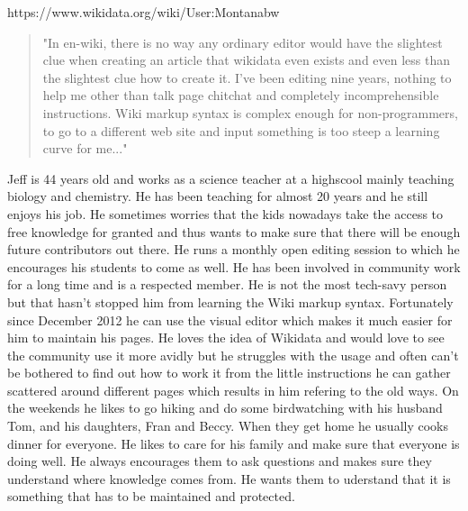 \documentclass{article}
\begin{document}
\pagebreak

https://www.wikidata.org/wiki/User:Montanabw
\begin{quote}
"In en-wiki, there is no way any ordinary editor would have the slightest clue when creating an article that wikidata even exists and even less than the slightest clue how to create it. I've been editing nine years, nothing to help me other than talk page chitchat and completely incomprehensible instructions. Wiki markup syntax is complex enough for non-programmers, to go to a different web site and input something is too steep a learning curve for me..."
\end{quote}


Jeff is 44 years old and works as a science teacher at a highscool mainly teaching biology and chemistry. He has been teaching for almost 20 years and he still enjoys his job. He sometimes worries that the kids nowadays take the access to free knowledge for granted and thus wants to make sure that there will be enough future contributors out there. He runs a monthly open editing session to which he encourages his students to come as well. He has been involved in community work for a long time and is a respected member. He is not the most tech-savy person but that hasn't stopped him from learning the Wiki markup syntax. Fortunately since December 2012 he can use the visual editor which makes it much easier for him to maintain his pages. He loves the idea of Wikidata and would love to see the community use it more avidly but he struggles with the usage and often can't be bothered to find out how to work it from the little instructions he can gather scattered around different pages which results in him refering to the old ways.
On the weekends he likes to go hiking and do some birdwatching with his husband Tom, and his daughters, Fran and Beccy. When they get home he usually cooks dinner for everyone. He likes to care for his family and make sure that everyone is doing well. He always encourages them to ask questions and makes sure they understand where knowledge comes from. He wants them to uderstand that it is something that has to be maintained and protected. 
\end{document}
